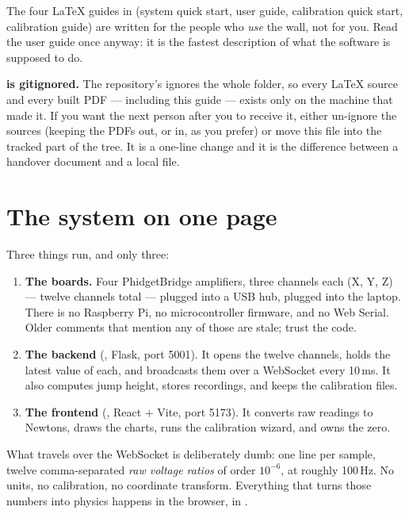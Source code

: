 \documentclass[11pt,a4paper]{article}
\begin{document}
The four LaTeX guides in  (system quick start, user guide,
calibration quick start, calibration guide) are written for the people who
\emph{use} the wall, not for you. Read the user guide once anyway: it is the
fastest description of what the software is supposed to do.

\begin{warnbox}
\textbf{ is gitignored.} The repository's  ignores
the whole folder, so every LaTeX source and every built PDF --- including this
guide --- exists only on the machine that made it. If you want the next person
after you to receive it, either un-ignore the sources (keeping the PDFs out, or
in, as you prefer) or move this file into the tracked part of the tree. It is a
one-line change and it is the difference between a handover document and a
local file.
\end{warnbox}

\section{The system on one page}

Three things run, and only three:

\begin{enumerate}
  \item \textbf{The boards.} Four PhidgetBridge amplifiers, three channels each
        (X, Y, Z) --- twelve channels total --- plugged into a USB hub, plugged
        into the laptop. There is no Raspberry Pi, no microcontroller firmware,
        and no Web Serial. Older comments that mention any of those are stale;
        trust the code.
  \item \textbf{The backend} (, Flask, port 5001). It opens
        the twelve channels, holds the latest value of each, and broadcasts them
        over a WebSocket every 10\,ms. It also computes jump height, stores
        recordings, and keeps the calibration files.
  \item \textbf{The frontend} (, React + Vite,
        port 5173). It converts raw readings to Newtons, draws the charts, runs
        the calibration wizard, and owns the zero.
\end{enumerate}

What travels over the WebSocket is deliberately dumb: one line per sample,
twelve comma-separated \emph{raw voltage ratios} of order $10^{-6}$, at roughly
100\,Hz. No units, no calibration, no coordinate transform. Everything that
turns those numbers into physics happens in the browser, in
.
\end{document}
